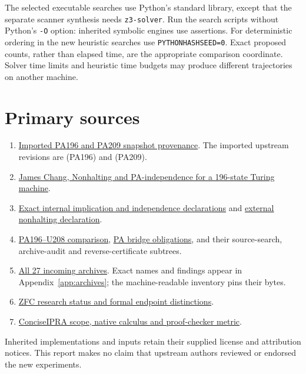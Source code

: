 \documentclass[10pt,letterpaper]{article}
\newcommand{\repo}{https://github.com/VladimirReshetnikov/ProveIt}
\newcommand{\pin}{906367250a7f96c923147b10df392294bced7be5}
\newcommand{\src}[2]{\href{\repo/blob/\pin/#1}{#2}}
\begin{document}
The selected executable searches use Python's standard library, except that
the separate scanner synthesis needs \texttt{z3-solver}. Run the search scripts
without Python's \texttt{-O} option: inherited symbolic engines use assertions.
For deterministic ordering in the new heuristic searches use
\texttt{PYTHONHASHSEED=0}. Exact proposed counts, rather than elapsed time, are
the appropriate comparison coordinate. Solver time limits and heuristic
time budgets may produce different trajectories on another machine.

\section{Primary sources}

\begin{enumerate}
\item \src{Computability/BusyBeaver/Research/PA/jamesyc-upstream/README.md}{Imported PA196 and PA209 snapshot provenance}. The imported upstream revisions are
 (PA196) and
 (PA209).
\item \src{Computability/BusyBeaver/Research/PA/jamesyc-upstream/pa196/paper/pa196.tex}{James Chang, Nonhalting and PA-independence for a 196-state Turing machine}.
\item \src{Computability/BusyBeaver/Research/PA/jamesyc-upstream/pa196/PA196/Independence.lean}{Exact internal implication and independence declarations} and
\src{Computability/BusyBeaver/Research/PA/jamesyc-upstream/pa196/PA196/Nonhalting.lean}{external nonhalting declaration}.
\item \src{Computability/BusyBeaver/Research/PA/pa196-vs-u208/COMPARISON.md}{PA196--U208 comparison},
\src{Computability/BusyBeaver/Research/PA/pa196-vs-u208/PA-BRIDGE.md}{PA bridge obligations}, and their source-search, archive-audit and reverse-certificate subtrees.
\item \href{\repo/tree/\pin/docs/incoming}{All 27 incoming archives}. Exact names
and findings appear in Appendix~\ref{app:archives}; the machine-readable inventory
pins their bytes.
\item \src{Computability/BusyBeaver/Research/ZFC/README.md}{ZFC research status and formal endpoint distinctions}.
\item \src{Logic/PrimitiveRecursiveArithmetic/ConciseIPRA/README.md}{ConciseIPRA scope, native calculus and proof-checker metric}.
\end{enumerate}

Inherited implementations and inputs retain their supplied license and attribution
notices. This report makes no claim that upstream authors reviewed or endorsed
the new experiments.
\end{document}
